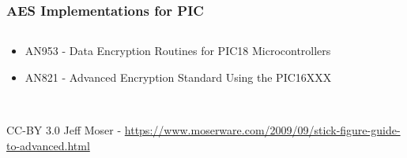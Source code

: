 \documentclass[aspectratio=169]{beamer}
\begin{document}
\begin{frame}
	\frametitle{AES Implementations for PIC}

	\begin{columns}
		\begin{column}{0.5\textwidth}
			\begin{itemize}
				\item AN953 - Data Encryption Routines for PIC18 Microcontrollers
				\item AN821 - Advanced Encryption Standard Using the PIC16XXX
			\end{itemize}
		\end{column}
		\begin{column}{0.5\textwidth}
			\\
		\end{column}
	\end{columns}

	~\\

	\tiny{CC-BY 3.0 Jeff Moser - \url{https://www.moserware.com/2009/09/stick-figure-guide-to-advanced.html}}
\end{frame}
\end{document}
